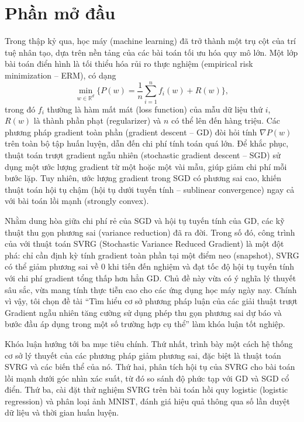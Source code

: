 \chapter*{Phần mở đầu}

Trong thập kỷ qua, học máy (machine learning) đã trở thành một trụ cột của trí tuệ nhân tạo, dựa trên nền tảng của các bài toán tối ưu hóa quy mô lớn. Một lớp bài toán điển hình là tối thiểu hóa rủi ro thực nghiệm (empirical risk minimization – ERM), có dạng
\begin{equation}
\min_{w \in \mathbb{R}^d} \Big\{ P(w) = \frac{1}{n}\sum_{i=1}^{n} f_i(w) + R(w) \Big\},
\end{equation}
trong đó $f_i$ thường là hàm mất mát (loss function) của mẫu dữ liệu thứ $i$, $R(w)$ là thành phần phạt (regularizer) và $n$ có thể lên đến hàng triệu. Các phương pháp gradient toàn phần (gradient descent – GD) đòi hỏi tính $\nabla P(w)$ trên toàn bộ tập huấn luyện, dẫn đến chi phí tính toán quá lớn. Để khắc phục, thuật toán trượt gradient ngẫu nhiên (stochastic gradient descent – SGD) sử dụng một ước lượng gradient từ một hoặc một vài mẫu, giúp giảm chi phí mỗi bước lặp. Tuy nhiên, ước lượng gradient trong SGD có phương sai cao, khiến thuật toán hội tụ chậm (hội tụ dưới tuyến tính – sublinear convergence) ngay cả với bài toán lồi mạnh (strongly convex).

Nhằm dung hòa giữa chi phí rẻ của SGD và hội tụ tuyến tính của GD, các kỹ thuật thu gọn phương sai (variance reduction) đã ra đời. Trong số đó, công trình của \citet{johnson2013accelerating} với thuật toán SVRG (Stochastic Variance Reduced Gradient) là một đột phá: chỉ cần định kỳ tính gradient toàn phần tại một điểm neo (snapshot), SVRG có thể giảm phương sai về 0 khi tiến đến nghiệm và đạt tốc độ hội tụ tuyến tính với chi phí gradient tổng thấp hơn hẳn GD. Chủ đề này vừa có ý nghĩa lý thuyết sâu sắc, vừa mang tính thực tiễn cao cho các ứng dụng học máy ngày nay. Chính vì vậy, tôi chọn đề tài “Tìm hiểu cơ sở phương pháp luận của các giải thuật trượt Gradient ngẫu nhiên tăng cường sử dụng phép thu gọn phương sai dự báo và bước đầu áp dụng trong một số trường hợp cụ thể” làm khóa luận tốt nghiệp.

Khóa luận hướng tới ba mục tiêu chính. Thứ nhất, trình bày một cách hệ thống cơ sở lý thuyết của các phương pháp giảm phương sai, đặc biệt là thuật toán SVRG và các biến thể của nó. Thứ hai, phân tích hội tụ của SVRG cho bài toán lồi mạnh dưới góc nhìn xác suất, từ đó so sánh độ phức tạp với GD và SGD cổ điển. Thứ ba, cài đặt thử nghiệm SVRG trên bài toán hồi quy logistic (logistic regression) và phân loại ảnh MNIST, đánh giá hiệu quả thông qua số lần duyệt dữ liệu và thời gian huấn luyện.

